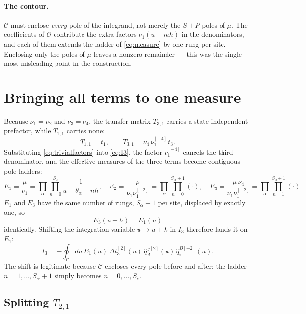 \documentclass[11pt]{article}
\newcommand{\Op}{\mathcal{O}}
\newcommand{\Cc}{\mathcal{C}}
\newcommand{\qh}{\hat q}
\newcommand{\shift}[1]{^{[#1]}}
\begin{document}
\paragraph{The contour.} $\Cc$ must enclose \emph{every} pole of the integrand, not merely the
$S+P$ poles of $\mu$. The coefficients of $\Op$ contribute the extra factors $\nu_1(u-mh)$ in the
denominators, and each of them extends the ladder of \eqref{eq:measure} by one rung per site.
Enclosing only the poles of $\mu$ leaves a nonzero remainder --- this was the single most
misleading point in the construction.

\section{Bringing all terms to one measure}
\label{sec:align}

Because $\nu_1=\nu_2$ and $\nu_3=\nu_4$, the transfer matrix $T_{3,1}$ carries a state-independent
prefactor, while $T_{1,1}$ carries none:
\begin{equation}
T_{1,1} = t_1 , \qquad T_{3,1} = \nu_4\,\nu_1\shift{-4}\,t_3 .
\label{eq:trivialfactors}
\end{equation}
Substituting \eqref{eq:trivialfactors} into \eqref{eq:I3}, the factor $\nu_1\shift{-4}$ cancels the
third denominator, and the effective measures of the three terms become contiguous pole ladders:
\begin{equation}
E_1 = \frac{\mu}{\nu_1} = \prod_\alpha \prod_{n=0}^{S_\alpha}\frac{1}{u-\theta_\alpha-nh} ,
\quad
E_2 = \frac{\mu}{\nu_1\nu_1\shift{-2}} = \prod_\alpha \prod_{n=0}^{S_\alpha+1}(\cdot) ,
\quad
E_3 = \frac{\mu\,\nu_4}{\nu_1\nu_1\shift{-2}} = \prod_\alpha \prod_{n=1}^{S_\alpha+1}(\cdot) .
\label{eq:ladders}
\end{equation}
$E_1$ and $E_3$ have the same number of rungs, $S_\alpha+1$ per site, displaced by exactly one, so
\begin{equation}
\boxed{\,E_3(u+h) = E_1(u)\,}
\label{eq:E3E1}
\end{equation}
identically. Shifting the integration variable $u\to u+h$ in $I_3$ therefore lands it on $E_1$:
\begin{equation}
I_3 = -\oint_{\Cc} du\ E_1(u)\ \Delta t_3\shift{2}(u)\ \qh^{\,j[2]}_A(u)\,\qh^{B[-2]}_i(u) .
\end{equation}
The shift is legitimate because $\Cc$ encloses every pole before and after: the ladder
$n=1,\dots,S_\alpha+1$ simply becomes $n=0,\dots,S_\alpha$.

\subsection{Splitting $T_{2,1}$}
\end{document}
